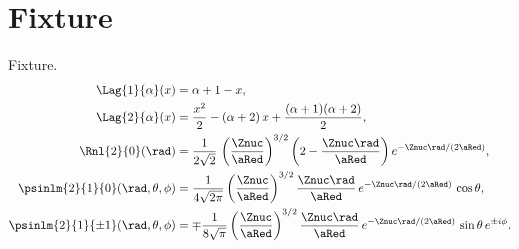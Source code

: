 \chapter{Fixture}\label{c11}

Fixture.
\begin{align}
  \Lag{1}{\alpha}(x) &= \alpha + 1 - x,
    \label{c11.eq.lag1} \\
  \Lag{2}{\alpha}(x) &= \frac{x^2}{2} - (\alpha + 2)\,x + \frac{(\alpha + 1)(\alpha + 2)}{2},
    \label{c11.eq.lag2} \\
  \Rnl{2}{0}(\rad) &= \frac{1}{2\sqrt{2}}\,\left(\frac{\Znuc}{\aRed}\right)^{3/2}\left(2 - \frac{\Znuc\rad}{\aRed}\right) e^{-\Znuc\rad/(2\aRed)},
    \label{c11.eq.r20} \\
  \psinlm{2}{1}{0}(\rad, \theta, \phi) &= \frac{1}{4\sqrt{2\pi}}\left(\frac{\Znuc}{\aRed}\right)^{3/2}\frac{\Znuc\rad}{\aRed}\,e^{-\Znuc\rad/(2\aRed)}\,\cos\theta,
    \label{c11.eq.psi210} \\
  \psinlm{2}{1}{\pm 1}(\rad, \theta, \phi) &= \mp\frac{1}{8\sqrt{\pi}}\left(\frac{\Znuc}{\aRed}\right)^{3/2}\frac{\Znuc\rad}{\aRed}\,e^{-\Znuc\rad/(2\aRed)}\,\sin\theta\,e^{\pm i\phi}.
    \label{c11.eq.psi21pm}
\end{align}
